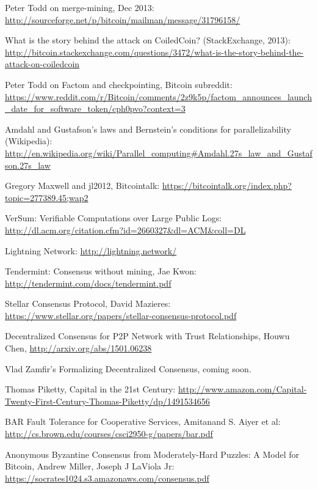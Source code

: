\documentclass[11pt,a4paper]{article}
\theoremstyle{plain}
\theoremstyle{definition}
\theoremstyle{remark}
\begin{document}
\begin{thebibliography}{34}

    Peter Todd on merge-mining, Dec 2013: \url{http://sourceforge.net/p/bitcoin/mailman/message/31796158/}

    What is the story behind the attack on CoiledCoin? (StackExchange, 2013): \url{http://bitcoin.stackexchange.com/questions/3472/what-is-the-story-behind-the-attack-on-coiledcoin}

    Peter Todd on Factom and checkpointing, Bitcoin subreddit: \url{https://www.reddit.com/r/Bitcoin/comments/2z9k5p/factom_announces_launch_date_for_software_token/cph0pvo?context=3}

    Amdahl and Gustafson's laws and Bernstein's conditions for parallelizability (Wikipedia): \url{http://en.wikipedia.org/wiki/Parallel_computing#Amdahl.27s_law_and_Gustafson.27s_law}

    Gregory Maxwell and jl2012, Bitcointalk: \url{https://bitcointalk.org/index.php?topic=277389.45;wap2}

    VerSum: Verifiable Computations over Large Public Logs: \url{http://dl.acm.org/citation.cfm?id=2660327&dl=ACM&coll=DL}

    Lightning Network: \url{http://lightning.network/}

    Tendermint: Consensus without mining, Jae Kwon: \url{http://tendermint.com/docs/tendermint.pdf}

    Stellar Consensus Protocol, David Mazieres: \url{https://www.stellar.org/papers/stellar-consensus-protocol.pdf}

    Decentralized Consensus for P2P Network with Trust Relationships, Houwu Chen, \url{http://arxiv.org/abs/1501.06238}

    Vlad Zamfir's Formalizing Decentralized Consensus, coming soon.

    Thomas Piketty, Capital in the 21st Century: \url{http://www.amazon.com/Capital-Twenty-First-Century-Thomas-Piketty/dp/1491534656}

    BAR Fault Tolerance for Cooperative Services, Amitanand S. Aiyer et al: \url{http://cs.brown.edu/courses/csci2950-g/papers/bar.pdf}

    Anonymous Byzantine Consensus from Moderately-Hard Puzzles: A Model for Bitcoin, Andrew Miller, Joseph J LaViola Jr: \url{https://socrates1024.s3.amazonaws.com/consensus.pdf}


\end{thebibliography}
\end{document}
